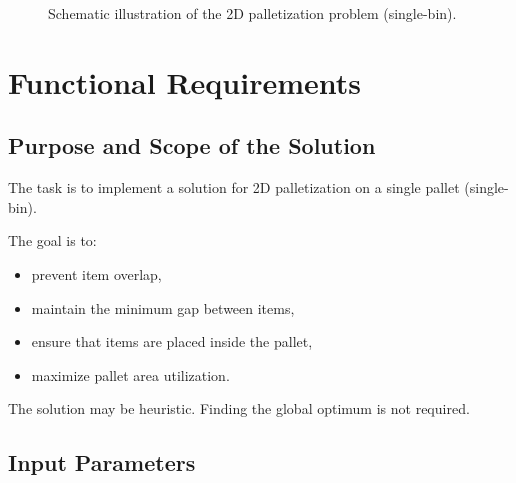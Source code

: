 \documentclass[12pt,a4paper]{article}
\begin{document}
\begin{figure}[H]
\centering
{}
\caption{Schematic illustration of the 2D palletization problem (single-bin).}
\label{fig:binpacking_schema}
\end{figure}

\section{Functional Requirements}

\subsection{Purpose and Scope of the Solution}

The task is to implement a solution for 2D palletization on a single pallet (single-bin).

The goal is to:

\begin{itemize}
    \item prevent item overlap,
    \item maintain the minimum gap between items,
    \item ensure that items are placed inside the pallet,
    \item maximize pallet area utilization.
\end{itemize}

The solution may be heuristic. Finding the global optimum is not required.

\subsection{Input Parameters}
\end{document}
